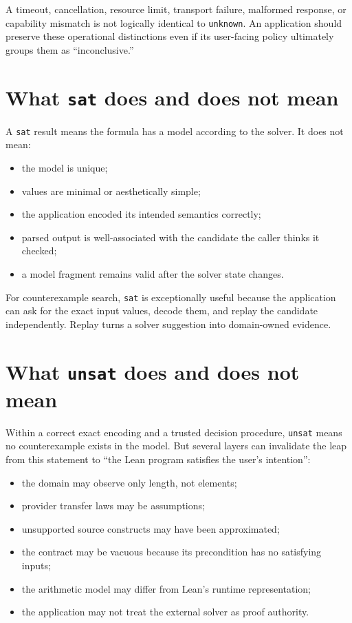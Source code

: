 \documentclass[10pt,letterpaper,oneside]{report}
\newcommand{\sat}{\texttt{sat}}
\newcommand{\unsat}{\texttt{unsat}}
\newcommand{\unknown}{\texttt{unknown}}
\begin{document}
A timeout, cancellation, resource limit, transport failure, malformed response, or capability mismatch is not logically identical to \unknown. An application should preserve these operational distinctions even if its user-facing policy ultimately groups them as ``inconclusive.''

\section{What \texttt{sat} does and does not mean}

A \sat{} result means the formula has a model according to the solver. It does not mean:

\begin{itemize}
\item the model is unique;
\item values are minimal or aesthetically simple;
\item the application encoded its intended semantics correctly;
\item parsed output is well-associated with the candidate the caller thinks it checked;
\item a model fragment remains valid after the solver state changes.
\end{itemize}

For counterexample search, \sat{} is exceptionally useful because the application can ask for the exact input values, decode them, and replay the candidate independently. Replay turns a solver suggestion into domain-owned evidence.

\section{What \texttt{unsat} does and does not mean}

Within a correct exact encoding and a trusted decision procedure, \unsat{} means no counterexample exists in the model. But several layers can invalidate the leap from this statement to ``the Lean program satisfies the user's intention'':

\begin{itemize}
\item the domain may observe only length, not elements;
\item provider transfer laws may be assumptions;
\item unsupported source constructs may have been approximated;
\item the contract may be vacuous because its precondition has no satisfying inputs;
\item the arithmetic model may differ from Lean's runtime representation;
\item the application may not treat the external solver as proof authority.
\end{itemize}
\end{document}
